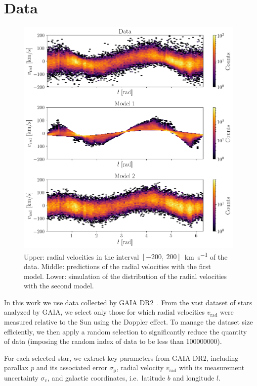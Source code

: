 \section{Data}

\begin{figure}[H]
    \centering
    \includegraphics[width=0.95\columnwidth]{Fig/DataModelPresentation.png}
    \caption{Upper: radial velocities in the interval $[-200,~200]$~\unit{\kilo\meter\per\second} of the data. Middle: predictions of the radial velocities with the first model. Lower: simulation of the distribution of the radial velocities with the second model.}
    \label{fig:DataModelPresentation}
\end{figure}

In this work we use data collected by GAIA DR2~\cite{GAIADR2}. 
From the vast dataset of stars analyzed by GAIA, we select only those 
for which radial velocities $v_{\text{rad}}$ were measured relative to the Sun using the Doppler effect. 
To manage the dataset size efficiently, we then apply a random selection to significantly reduce the quantity of data 
(imposing the random index of data to be less than 100000000).

For each selected star, we extract key parameters from GAIA DR2, 
including parallax $p$ and its associated error $\sigma_{\text{p}}$, 
radial velocity $v_{\text{rad}}$ with its measurement uncertainty $\sigma_{\text{v}}$, 
and galactic coordinates, i.e.\ latitude $b$ and longitude $l$.

